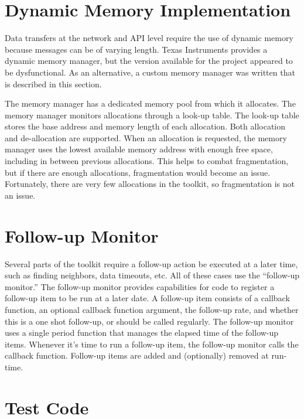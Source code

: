 \begin{appendices}
\chapter{Dynamic Memory Implementation}\label{sec:appendix:dynamic_memory}

Data transfers at the network and API level require the use of dynamic memory because messages can be of varying length. Texas Instruments provides a dynamic memory manager, but the version available for the project appeared to be dysfunctional. As an alternative, a custom memory manager was written that is described in this section. 

The memory manager has a dedicated memory pool from which it allocates. The memory manager monitors allocations through a look-up table. The look-up table stores the base address and memory length of each allocation. Both allocation and de-allocation are supported. When an allocation is requested, the memory manager uses the lowest available memory address with enough free space, including in between previous allocations. This helps to combat fragmentation, but if there are enough allocations, fragmentation would become an issue. Fortunately, there are very few allocations in the toolkit, so fragmentation is not an issue.

\chapter{Follow-up Monitor}\label{sec:appendix:follow_up_monitor}

Several parts of the toolkit require a follow-up action be executed at a later time, such as finding neighbors, data timeouts, etc. All of these cases use the ``follow-up monitor.'' The follow-up monitor provides capabilities for code to register a follow-up item to be run at a later date. A follow-up item consists of a callback function, an optional callback function argument, the follow-up rate, and whether this is a one shot follow-up, or should be called regularly. The follow-up monitor uses a single period function that manages the elapsed time of the follow-up items. Whenever it's time to run a follow-up item, the follow-up monitor calls the callback function. Follow-up items are added and (optionally) removed at run-time.

\chapter{Test Code} \label{sec:appendix:mpi_test_code}


\end{appendices}
